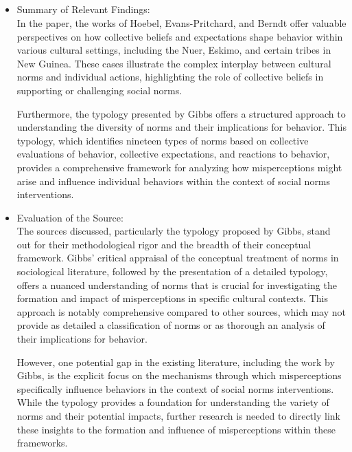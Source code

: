 \documentclass{article}
\begin{document}
\subsection{}
\begin{itemize}
    \item Summary of Relevant Findings:\\
In the paper, the works of Hoebel, Evans-Pritchard, and Berndt offer valuable perspectives on how collective beliefs and expectations shape behavior within various cultural settings, including the Nuer, Eskimo, and certain tribes in New Guinea. These cases illustrate the complex interplay between cultural norms and individual actions, highlighting the role of collective beliefs in supporting or challenging social norms.

Furthermore, the typology presented by Gibbs offers a structured approach to understanding the diversity of norms and their implications for behavior. This typology, which identifies nineteen types of norms based on collective evaluations of behavior, collective expectations, and reactions to behavior, provides a comprehensive framework for analyzing how misperceptions might arise and influence individual behaviors within the context of social norms interventions.
\end{itemize}
\begin{itemize}
    \item Evaluation of the Source:\\
The sources discussed, particularly the typology proposed by Gibbs, stand out for their methodological rigor and the breadth of their conceptual framework. Gibbs' critical appraisal of the conceptual treatment of norms in sociological literature, followed by the presentation of a detailed typology, offers a nuanced understanding of norms that is crucial for investigating the formation and impact of misperceptions in specific cultural contexts. This approach is notably comprehensive compared to other sources, which may not provide as detailed a classification of norms or as thorough an analysis of their implications for behavior.

However, one potential gap in the existing literature, including the work by Gibbs, is the explicit focus on the mechanisms through which misperceptions specifically influence behaviors in the context of social norms interventions. While the typology provides a foundation for understanding the variety of norms and their potential impacts, further research is needed to directly link these insights to the formation and influence of misperceptions within these frameworks.
\end{itemize}
\end{document}
